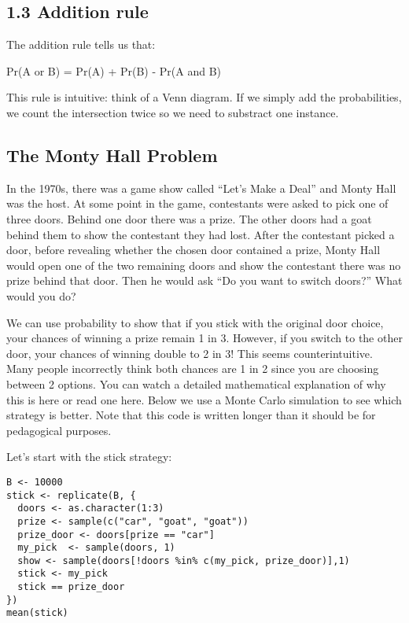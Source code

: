 \documentclass[
]{article}
\begin{document}
\hypertarget{addition-rule}{%
\subsection{1.3 Addition rule}\label{addition-rule}}

The addition rule tells us that:

Pr(A or B) = Pr(A) + Pr(B) - Pr(A and B)

This rule is intuitive: think of a Venn diagram. If we simply add the
probabilities, we count the intersection twice so we need to substract
one instance.

\hypertarget{the-monty-hall-problem}{%
\subsection{The Monty Hall Problem}\label{the-monty-hall-problem}}

In the 1970s, there was a game show called ``Let's Make a Deal'' and
Monty Hall was the host. At some point in the game, contestants were
asked to pick one of three doors. Behind one door there was a prize. The
other doors had a goat behind them to show the contestant they had lost.
After the contestant picked a door, before revealing whether the chosen
door contained a prize, Monty Hall would open one of the two remaining
doors and show the contestant there was no prize behind that door. Then
he would ask ``Do you want to switch doors?'' What would you do?

We can use probability to show that if you stick with the original door
choice, your chances of winning a prize remain 1 in 3. However, if you
switch to the other door, your chances of winning double to 2 in 3! This
seems counterintuitive. Many people incorrectly think both chances are 1
in 2 since you are choosing between 2 options. You can watch a detailed
mathematical explanation of why this is here or read one here. Below we
use a Monte Carlo simulation to see which strategy is better. Note that
this code is written longer than it should be for pedagogical purposes.

Let's start with the stick strategy:

\begin{verbatim}
B <- 10000
stick <- replicate(B, {
  doors <- as.character(1:3)
  prize <- sample(c("car", "goat", "goat"))
  prize_door <- doors[prize == "car"]
  my_pick  <- sample(doors, 1)
  show <- sample(doors[!doors %in% c(my_pick, prize_door)],1)
  stick <- my_pick
  stick == prize_door
})
mean(stick)
\end{verbatim}
\end{document}
